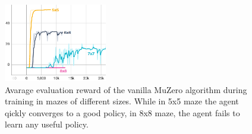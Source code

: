 \documentclass[12pt]{article}
\begin{document}
\begin{figure}[h!]
  \centering
  \includegraphics[width=0.4\textwidth]{MuZero_learning.png}
  \caption{Avarage evaluation reward of the vanilla MuZero algorithm during training in mazes of different sizes. While in 5x5 maze the agent qickly converges to a good policy, in 8x8 maze, the agent fails to learn any useful policy.}
  \label{fig:MuZero_learning}
\end{figure}
\end{document}
